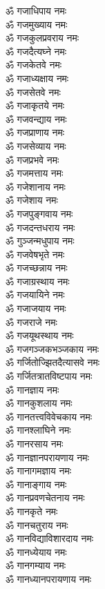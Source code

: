 \begin{multicols}{2}
\begin{flushleft}
ॐ गजाधिपाय नमः\\
ॐ गजमुख्याय नमः\\
ॐ गजकुलप्रवराय नमः\\
ॐ गजदैत्यघ्ने नमः\\
ॐ गजकेतवे नमः\\
ॐ गजाध्यक्षाय नमः\\
ॐ गजसेतवे नमः\\
ॐ गजाकृतये नमः\\
ॐ गजवन्द्याय नमः\hfill{}\\
ॐ गजप्राणाय नमः\\
ॐ गजसेव्याय नमः\\
ॐ गजप्रभवे नमः\\
ॐ गजमत्ताय नमः\\
ॐ गजेशानाय नमः\\
ॐ गजेशाय नमः\\
ॐ गजपुङ्गवाय नमः\\
ॐ गजदन्तधराय नमः\\
ॐ गुञ्जन्मधुपाय नमः\\
ॐ गजवेषभृते नमः\hfill{}\\
ॐ गजच्छन्नाय नमः\\
ॐ गजाग्रस्थाय नमः\\
ॐ गजयायिने नमः\\
ॐ गजाजयाय नमः\\
ॐ गजराजे नमः\\
ॐ गजयूथस्थाय नमः\\
ॐ गजगञ्जकभञ्जकाय नमः\\
ॐ गर्जितोज्झितदैत्यासवे नमः\\
ॐ गर्जितत्रातविष्टपाय नमः\\
ॐ गानज्ञाय नमः\hfill{}\\
ॐ गानकुशलाय नमः\\
ॐ गानतत्त्वविवेचकाय नमः\\
ॐ गानश्लाघिने नमः\\
ॐ गानरसाय नमः\\
ॐ गानज्ञानपरायणाय नमः\\
ॐ गानागमज्ञाय नमः\\
ॐ गानाङ्गाय नमः\\
ॐ गानप्रवणचेतनाय नमः\\
ॐ गानकृते नमः\\
ॐ गानचतुराय नमः\hfill{}\\
ॐ गानविद्याविशारदाय नमः\\
ॐ गानध्येयाय नमः\\
ॐ गानगम्याय नमः\\
ॐ गानध्यानपरायणाय नमः\\

\end{flushleft}
\end{multicols}

